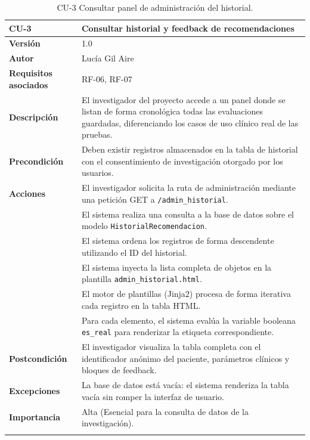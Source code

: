 \begin{table}[!h]
	\centering
	\begin{tabular}{ l p{10cm} }
		\toprule
		\textbf{CU-3} & \textbf{Consultar historial y feedback de recomendaciones}\\
		\midrule
		\addlinespace
		\textbf{Versión}   & 1.0 \\
		\addlinespace
		\textbf{Autor}  & Lucía Gil Aire \\
		\addlinespace
		\textbf{Requisitos asociados} & RF-06, RF-07 \\
		\addlinespace
		\textbf{Descripción} & El investigador del proyecto accede a un panel donde se listan de forma cronológica todas las evaluaciones guardadas, diferenciando los casos de uso clínico real de las pruebas. \\
		\addlinespace
		\textbf{Precondición}  & Deben existir registros almacenados en la tabla de historial con el consentimiento de investigación otorgado por los usuarios. \\
		\addlinespace
		\textbf{Acciones} &  El investigador solicita la ruta de administración mediante una petición GET a \texttt{/admin\_historial}. \\
		&  El sistema realiza una consulta a la base de datos sobre el modelo \texttt{HistorialRecomendacion}. \\
		&  El sistema ordena los registros de forma descendente utilizando el ID del historial. \\
		&  El sistema inyecta la lista completa de objetos en la plantilla \texttt{admin\_historial.html}. \\
		&  El motor de plantillas (Jinja2) procesa de forma iterativa cada registro en la tabla HTML. \\
		&  Para cada elemento, el sistema evalúa la variable booleana \texttt{es\_real} para renderizar la etiqueta correspondiente. \\
		\addlinespace
		\textbf{Postcondición} & El investigador visualiza la tabla completa con el identificador anónimo del paciente, parámetros clínicos y bloques de feedback. \\
		\addlinespace
		\textbf{Excepciones}  & La base de datos está vacía: el sistema renderiza la tabla vacía sin romper la interfaz de usuario. \\
		\addlinespace
		\textbf{Importancia}  & Alta (Esencial para la consulta de datos de la investigación). \\
		\addlinespace
		\bottomrule
	\end{tabular}
	\caption{CU-3 Consultar panel de administración del historial.}
\end{table}
\FloatBarrier

